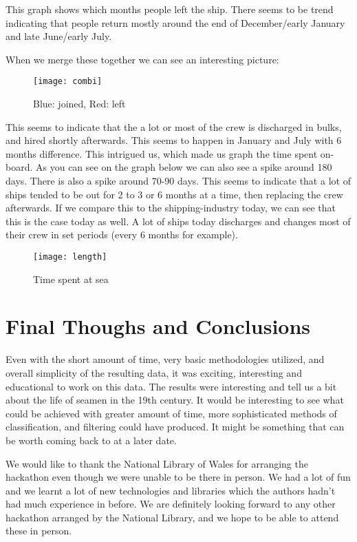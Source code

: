 \documentclass{article}
\begin{document}
This graph shows which months people left the ship. There seems to be trend indicating that people return mostly around the end of December/early January and late June/early July.

When we merge these together we can see an interesting picture:

\begin{figure}[H]
	\centering
	\texttt{[image: combi]}
  	\caption{Blue: joined, Red: left}
\end{figure}

This seems to indicate that the a lot or most of the crew is discharged in bulks, and hired shortly afterwards. This seems to happen in January and July with 6 months difference.
This intrigued us, which made us graph the time spent on-board. As you can see on the graph below we can also see a spike around 180 days. There is also a spike around 70-90 days. This seems to indicate that a lot of ships tended to be out for 2 to 3 or 6 months at a time, then replacing the crew afterwards.
If we compare this to the shipping-industry today, we can see that this is the case today as well.
A lot of ships today discharges and changes most of their crew in set periods (every 6 months for example).

\begin{figure}[H]
	\centering
	\texttt{[image: length]}
  	\caption{Time spent at sea}
\end{figure}

\section{Final Thoughs and Conclusions}

Even with the short amount of time, very basic methodologies utilized, and overall simplicity of the resulting data, it was exciting, interesting and educational to work on this data. 
The results were interesting and tell us a bit about the life of seamen in the 19th century.
It would be interesting to see what could be achieved with greater amount of time, more sophisticated methods of classification, and filtering could have produced.
It might be something that can be worth coming back to at a later date.

We would like to thank the National Library of Wales for arranging the hackathon even though we were unable to be there in person.
We had a lot of fun and we learnt a lot of new technologies and libraries which the authors hadn't had much experience in before.
We are definitely looking forward to any other hackathon arranged by the National Library, and we hope to be able to attend these in person.
\end{document}
